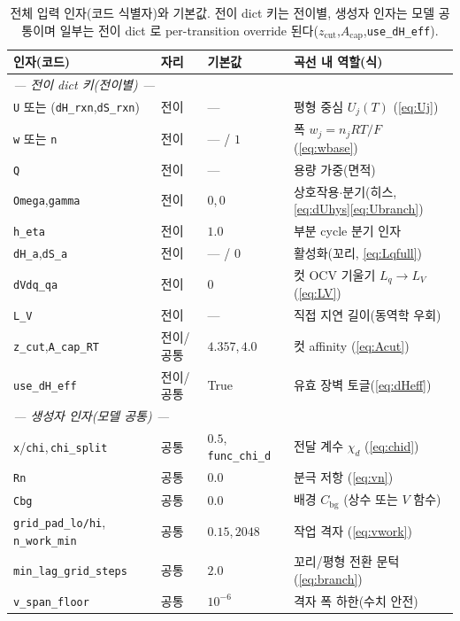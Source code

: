 \documentclass[11pt,a4paper]{article}
\newcommand{\bg}{\mathrm{bg}}
\newcommand{\code}[1]{\texttt{#1}}
\begin{document}
\begin{table}[t]
\centering\footnotesize
\renewcommand{\arraystretch}{1.18}
\caption{전체 입력 인자(코드 식별자)와 기본값. 전이 dict 키는 전이별, 생성자 인자는 모델 공통이며 일부는 전이 dict 로
per-transition override 된다($z_\mathrm{cut}$,$A_\mathrm{cap}$,\code{use\_dH\_eff}).}
\label{tab:inputs}
\begin{tabular}{l l l l}
\toprule
인자(코드) & 자리 & 기본값 & 곡선 내 역할(식) \\
\midrule
\multicolumn{4}{l}{\emph{— 전이 dict 키(전이별) —}}\\
\code{U} 또는 (\code{dH\_rxn},\code{dS\_rxn}) & 전이 & --- & 평형 중심 $U_j(T)$ (\eqref{eq:Uj}) \\
\code{w} 또는 \code{n} & 전이 & --- / $1$ & 폭 $w_j=n_jRT/F$ (\eqref{eq:wbase}) \\
\code{Q} & 전이 & --- & 용량 가중(면적) \\
\code{Omega},\code{gamma} & 전이 & $0$,\,$0$ & 상호작용$\cdot$분기(히스, \eqref{eq:dUhys}\eqref{eq:Ubranch}) \\
\code{h\_eta} & 전이 & $1.0$ & 부분 cycle 분기 인자 \\
\code{dH\_a},\code{dS\_a} & 전이 & --- / $0$ & 활성화(꼬리, \eqref{eq:Lqfull}) \\
\code{dVdq\_qa} & 전이 & $0$ & 컷 OCV 기울기 $L_q\!\to\!L_V$ (\eqref{eq:LV}) \\
\code{L\_V} & 전이 & --- & 직접 지연 길이(동역학 우회) \\
\code{z\_cut},\code{A\_cap\_RT} & 전이/공통 & $4.357$,\,$4.0$ & 컷 affinity (\eqref{eq:Acut}) \\
\code{use\_dH\_eff} & 전이/공통 & True & 유효 장벽 토글(\eqref{eq:dHeff}) \\
\multicolumn{4}{l}{\emph{— 생성자 인자(모델 공통) —}}\\
\code{x}/\code{chi},\,\code{chi\_split} & 공통 & $0.5$,\,\code{func\_chi\_d} & 전달 계수 $\chi_d$ (\eqref{eq:chid}) \\
\code{Rn} & 공통 & $0.0$ & 분극 저항 (\eqref{eq:vn}) \\
\code{Cbg} & 공통 & $0.0$ & 배경 $C_\bg$ (상수 또는 $V$ 함수) \\
\code{grid\_pad\_lo/hi},\,\code{n\_work\_min} & 공통 & $0.15$,\,$2048$ & 작업 격자 (\eqref{eq:vwork}) \\
\code{min\_lag\_grid\_steps} & 공통 & $2.0$ & 꼬리/평형 전환 문턱 (\eqref{eq:branch}) \\
\code{v\_span\_floor} & 공통 & $10^{-6}$ & 격자 폭 하한(수치 안전) \\

\end{tabular}
\end{table}
\end{document}
